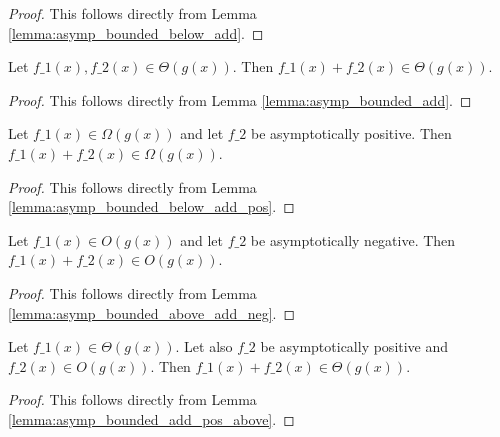 \begin{proof}
    \leanok
    This follows directly from Lemma \ref{lemma:asymp_bounded_below_add}.
\end{proof}

\begin{lemma}
    \label{lemma:theta_add}
    \leanok
    Let $f\_1(x), f\_2(x) \in \Theta(g(x))$. Then $f\_1(x) + f\_2(x) \in \Theta(g(x))$.
\end{lemma}

\begin{proof}
    \leanok
    This follows directly from Lemma \ref{lemma:asymp_bounded_add}.
\end{proof}

\begin{lemma}
    \label{lemma:Omega_add_pos}
    \leanok
    Let $f\_1(x) \in \Omega(g(x))$ and let $f\_2$ be asymptotically positive. 
    Then $f\_1(x) + f\_2(x) \in \Omega(g(x))$.
\end{lemma}

\begin{proof}
    \leanok
    This follows directly from Lemma \ref{lemma:asymp_bounded_below_add_pos}.
\end{proof}

\begin{lemma}
    \label{lemma:O_add_neg}
    \leanok
    Let $f\_1(x) \in O(g(x))$ and let $f\_2$ be asymptotically negative. 
    Then $f\_1(x) + f\_2(x) \in O(g(x))$.
\end{lemma}

\begin{proof}
    \leanok
    This follows directly from Lemma \ref{lemma:asymp_bounded_above_add_neg}.
\end{proof}

\begin{lemma}
    \label{lemma:theta_add_pos_O}
    \leanok
    Let $f\_1(x) \in \Theta(g(x))$. Let also $f\_2$ be asymptotically positive and
    $f\_2(x) \in O(g(x))$. Then $f\_1(x) + f\_2(x) \in \Theta(g(x))$.
\end{lemma}

\begin{proof}
    \leanok
    This follows directly from Lemma \ref{lemma:asymp_bounded_add_pos_above}.
\end{proof}

